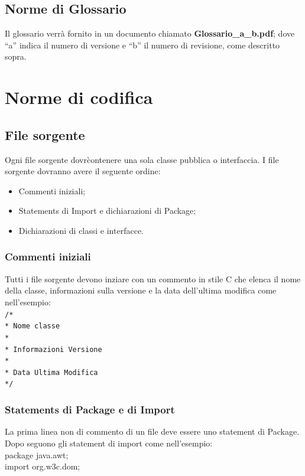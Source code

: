 \documentclass[11pt,titlepage,a4paper]{report}
\begin{document}
\section{Norme di Glossario}
Il glossario verr\`a fornito in un documento chiamato \textbf{ Glossario\_a\_b.pdf}; dove ``a'' indica il numero di versione e ``b'' il numero di revisione, come descritto sopra.





\chapter{Norme di codifica}
\section{File sorgente}
Ogni file sorgente dovr\` contenere una sola classe pubblica o interfaccia. I file sorgente dovranno avere il seguente ordine:
\begin{itemize}
\item Commenti iniziali;
\item Statements di Import e dichiarazioni di Package;
\item Dichiarazioni di classi e interfacce.
\end{itemize}
\subsection{Commenti iniziali}
Tutti i file sorgente devono inziare con un commento in stile C che elenca il nome della classe, informazioni sulla versione e la data dell'ultima modifica come nell'esempio: \\
 \newline
\texttt{/* \\
* Nome classe \\
* \\
* Informazioni Versione \\
* \\
* Data Ultima Modifica \\
*/ \\}
 \newline
\subsection{Statements di Package e di Import}
La prima linea non di commento di un file deve essere uno statement di Package. Dopo seguono gli statement di import come nell'esempio: \\
 \newline
package java.awt; \\ %
import org.w3c.dom; \\
\end{document}
